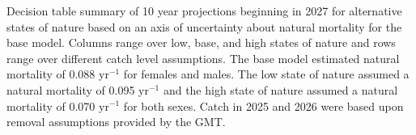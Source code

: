 \documentclass[
  english,
]{article}
\begin{document}
\begin{landscape}
\begin{longtable}
\end{longtable}

\endgroup

\end{landscape}

\begin{table}[H]

\caption{\label{tbl-es-decision-table}Decision table summary of 10 year
projections beginning in 2027 for alternative states of nature based on
an axis of uncertainty about natural mortality for the base model.
Columns range over low, base, and high states of nature and rows range
over different catch level assumptions. The base model estimated natural
mortality of 0.088 yr\(^{-1}\) for females and males. The low state of
nature assumed a natural mortality of 0.095 yr\(^{-1}\) and the high
state of nature assumed a natural mortality of 0.070 yr\(^{-1}\) for
both sexes. Catch in 2025 and 2026 were based upon removal assumptions
provided by the GMT.}

\centering{

}
\end{table}
\end{document}
